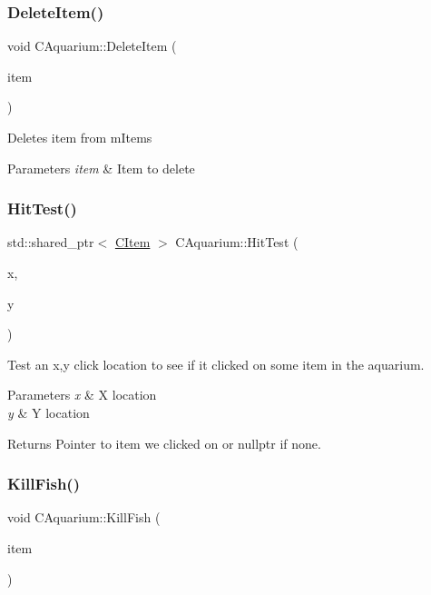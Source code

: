 \subsubsection{\texorpdfstring{Delete\+Item()}{DeleteItem()}}
{\footnotesize\ttfamily void C\+Aquarium\+::\+Delete\+Item (\begin{DoxyParamCaption}\item[{std\+::shared\+\_\+ptr$<$ \hyperlink{class_c_item}{C\+Item} $>$}]{item }\end{DoxyParamCaption})}

Deletes item from m\+Items 
\begin{DoxyParams}{Parameters}
{\em item} & Item to delete \\
\hline
\end{DoxyParams}
\mbox{\label{class_c_aquarium_a7129486467e76938fbc049723f9187f3}} 
\subsubsection{\texorpdfstring{Hit\+Test()}{HitTest()}}
{\footnotesize\ttfamily std\+::shared\+\_\+ptr$<$ \hyperlink{class_c_item}{C\+Item} $>$ C\+Aquarium\+::\+Hit\+Test (\begin{DoxyParamCaption}\item[{int}]{x,  }\item[{int}]{y }\end{DoxyParamCaption})}

Test an x,y click location to see if it clicked on some item in the aquarium. 
\begin{DoxyParams}{Parameters}
{\em x} & X location \\
\hline
{\em y} & Y location \\
\hline
\end{DoxyParams}
\begin{DoxyReturn}{Returns}
Pointer to item we clicked on or nullptr if none. 
\end{DoxyReturn}
\mbox{\label{class_c_aquarium_ae159ee63d91f3a4b37644640fa67fdd8}} 
\subsubsection{\texorpdfstring{Kill\+Fish()}{KillFish()}}
{\footnotesize\ttfamily void C\+Aquarium\+::\+Kill\+Fish (\begin{DoxyParamCaption}\item[{std\+::shared\+\_\+ptr$<$ \hyperlink{class_c_item}{C\+Item} $>$}]{item }\end{DoxyParamCaption})\hspace{0.3cm}{\ttfamily [virtual]}}

